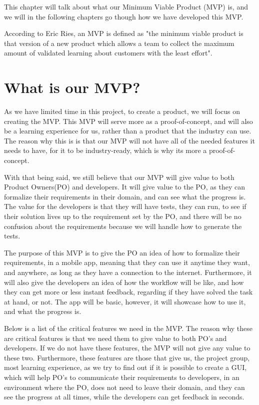 This chapter will talk about what our Minimum Viable Product (MVP) is, and we will in the following chapters go though how we have developed this MVP.

According to Eric Ries, an MVP is defined as "the minimum viable product is that version of a new product which allows a team to collect the maximum amount of validated learning about customers with the least effort"\cite{whatIsMVP}.

\section{What is our MVP?}
As we have limited time in this project, to create a product, we will focus on creating the MVP.
This MVP will serve more as a proof-of-concept, and will also be a learning experience for us, rather than a product that the industry can use.
The reason why this is is that our MVP will not have all of the needed features it needs to have, for it to be industry-ready, which is why its more a proof-of-concept.

With that being said, we still believe that our MVP will give value to both Product Owners(PO) and developers.
It will give value to the PO, as they can formalize their requirements in their domain, and can see what the progress is.
The value for the developers is that they will have tests, they can run, to see if their solution lives up to the requirement set by the PO, and there will be no confusion about the requirements because we will handle how to generate the tests. 

The purpose of this MVP is to give the PO an idea of how to formalize their requirements, in a mobile app, meaning that they can use it anytime they want, and anywhere, as long as they have a connection to the internet.
Furthermore, it will also give the developers an idea of how the workflow will be like, and how they can get more or less instant feedback, regarding if they have solved the task at hand, or not. 
The app will be basic, however, it will showcase how to use it, and what the progress is.

Below is a list of the critical features we need in the MVP.
The reason why these are critical features is that we need them to give value to both PO's and developers.
If we do not have these features, the MVP will not give any value to these two.
Furthermore, these features are those that give us, the project group, most learning experience, as we try to find out if it is possible to create a GUI, which will help PO's to communicate their requirements to developers, in an environment where the PO, does not need to leave their domain, and they can see the progress at all times, while the developers can get feedback in seconds.

